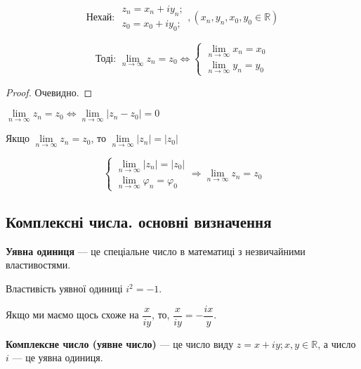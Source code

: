\begin{theorem}
$$
\text{Нехай: } \begin{array}{l}
z_n=x_n+iy_n; \\
z_0=x_0+iy_0;
\end{array}, 
(x_n,y_n,x_0,y_0 \in \mathbb{R})
$$

$$
\text{Тоді: }\lim\limits_{n\rightarrow\infty} z_n = z_0 \Leftrightarrow 
\left\{ \begin{array}{l}
\lim\limits_{n\rightarrow\infty} x_n = x_0 \\
\lim\limits_{n\rightarrow\infty} y_n = y_0
\end{array}\right.
$$
\end{theorem}
\begin{proof}
Очевидно.
\end{proof}

\begin{claim}
$\lim\limits_{n\rightarrow\infty} z_n = z_0 \Leftrightarrow \lim\limits_{n\rightarrow\infty} |z_n-z_0| = 0$
\end{claim}

\begin{theorem}
Якщо $\lim\limits_{n\rightarrow\infty} z_n = z_0$, то $\lim\limits_{n\rightarrow\infty} |z_n| = |z_0|$
\end{theorem}

\begin{theorem}
$$ 
\left\{ \begin{array}{l}
\lim\limits_{n\rightarrow\infty} |z_n| = |z_0| \\
\lim\limits_{n\rightarrow\infty} \varphi_n = \varphi_0
\end{array}\right.
\Rightarrow \lim\limits_{n\rightarrow\infty} z_n = z_0
$$
\end{theorem}


\subsection{Комплексні числа. основні визначення}

\textbf{Уявна одиниця} --- це спеціальне число в математиці з незвичайними властивостями.

Властивість уявної одиниці $i^2 = -1$.

Якщо ми маємо щось схоже на $\dfrac{x}{iy}$, то, $\dfrac{x}{iy} = - \dfrac{ix}{y}$.

\textbf{Комплексне число (уявне число)} --- це число виду $z = x + iy; x, y \in \mathbb{R}$,
а число $i$ --- це уявна одиниця.

